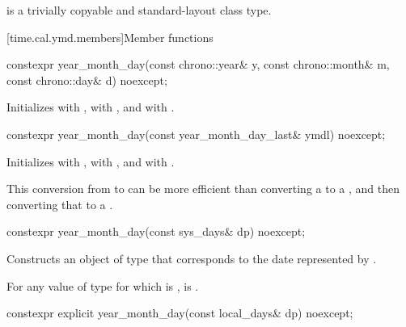 \pnum
{} is a trivially copyable and standard-layout class type.

[time.cal.ymd.members]{Member functions}

%
\begin{itemdecl}
constexpr year_month_day(const chrono::year& y, const chrono::month& m,
                         const chrono::day& d) noexcept;
\end{itemdecl}

\begin{itemdescr}
\pnum
\effects
Initializes
 with ,
 with , and
 with .
\end{itemdescr}

%
\begin{itemdecl}
constexpr year_month_day(const year_month_day_last& ymdl) noexcept;
\end{itemdecl}

\begin{itemdescr}
\pnum
\effects
Initializes
 with ,
 with , and
 with .
\begin{note}
This conversion from  to 
can be more efficient than converting a  to a ,
and then converting that  to a .
\end{note}
\end{itemdescr}

%
\begin{itemdecl}
constexpr year_month_day(const sys_days& dp) noexcept;
\end{itemdecl}

\begin{itemdescr}
\pnum
\effects
Constructs an object of type 
that corresponds to the date represented by .

\pnum
\remarks
For any value  of type 
for which  is ,
is .
\end{itemdescr}

%
\begin{itemdecl}
constexpr explicit year_month_day(const local_days& dp) noexcept;
\end{itemdecl}

